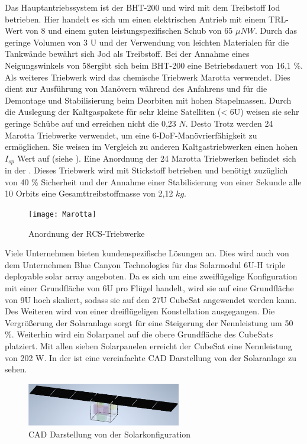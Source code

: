 	Das Hauptantriebssystem ist der BHT-200 und wird mit dem Treibstoff Iod betrieben. Hier handelt es sich um einen elektrischen Antrieb mit einem TRL-Wert von 8 und einem guten leistungspezifischen Schub von 65 ${\mu N}{W}$. Durch das geringe Volumen von 3 U und der Verwendung von leichten Materialen für die Tankwände bewährt sich Jod als Treibstoff. Bei der Annahme eines Neigungswinkels von 58\textdegree ergibt sich beim BHT-200 eine Betriebsdauert von 16,1 \%. Als weiteres Triebwerk wird das chemische Triebwerk Marotta verwendet. Dies dient zur Ausführung von Manövern während des Anfahrens und für die Demontage und Stabilisierung beim Deorbiten mit hohen Stapelmassen. Durch die Auslegung der Kaltgaspakete für sehr kleine Satelliten (< 6U) weisen sie sehr geringe Schübe auf und erreichen nicht die 0,23 $N$. Desto Trotz werden 24 Marotta Triebwerke verwendet, um eine 6-DoF-Manövrierfähigkeit zu ermöglichen. Sie weisen im Vergleich zu anderen Kaltgastriebwerken einen hohen $I_{sp}$ Wert auf (siehe ). Eine Anordnung der 24 Marotta Triebwerken befindet sich in der . Dieses Triebwerk wird mit Stickstoff betrieben und benötigt zuzüglich von 40 \% Sicherheit und der Annahme einer Stabilisierung von einer Sekunde alle 10 Orbits  eine Gesamttreibstoffmasse von 2,12 $kg$.
\begin{figure}[!h]
\centering
	\texttt{[image: Marotta]}
	\caption{Anordnung der RCS-Triebwerke \cite{Lettau.}}
	\label{fig:marotta}
\end{figure}

	Viele Unternehmen bieten kundenspezifische Lösungen an. Dies wird auch von dem Unternehmen Blue Canyon Technologies für das Solarmodul 6U-H triple deployable solar array angeboten. Da es sich um eine zweiflügelige Konfiguration mit einer Grundfläche von 6U pro Flügel handelt, wird sie auf eine Grundfläche von 9U hoch skaliert, sodass sie auf  den 27U CubeSat angewendet werden kann. Des Weiteren wird von einer dreiflügeligen Konstellation ausgegangen. Die Vergrößerung der Solaranlage sorgt für eine Steigerung der Nennleistung um 50 \%. Weiterhin wird ein Solarpanel auf die obere Grundfläche des CubeSats platziert. Mit allen sieben Solarpanelen erreicht der CubeSat eine Nennleistung von 202 W. In der  ist eine vereinfachte CAD Darstellung von der Solaranlage zu sehen. 
\begin{figure}[!h]
\centering
	\includegraphics[width=0.60\textwidth]{graphics/Solarpanel.PNG}
	\caption{CAD Darstellung von der Solarkonfiguration \cite{Lettau.}}
	\label{fig:solarpanel}
\end{figure}

